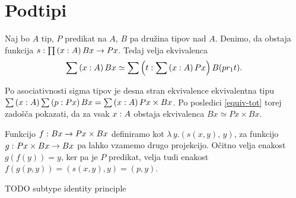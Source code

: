 \section{Podtipi}

\begin{trditev}
  \label{full-subtype}
  Naj bo \(A\) tip, \(P\) predikat na \(A\), \(B\) pa družina tipov nad \(A\). Denimo, da
  obstaja funkcija \(s : \prod \left( x : A \right) Bx \to Px\). Tedaj velja ekvivalenca
  \[\sum \left( x : A \right) Bx \simeq \sum \left( t : \sum \left( x : A \right) Px \right) B (pr_{1} t).\]
\end{trditev}

\begin{dokaz}
  Po asociativnosti sigma tipov je desna stran ekvivalence ekvivalentna tipu
  \(\sum \left( x : A \right) \sum \left( p : Px \right) Bx = \sum \left( x : A \right) Px \times Bx\).
  Po posledici \ref{equiv-tot} torej zadošča pokazati, da za vsak \(x : A\)
  obstaja ekvivalenca \(Bx \simeq Px \times Bx\).

  Funkcijo \(f \,\colon Bx \to Px \times Bx\) definiramo kot
  \(\lambda \, y. \left(s(x,y),\, y\right)\), za funkcijo \(g \,\colon Px \times Bx \to Bx\) pa
  lahko vzamemo drugo projekcijo. Očitno velja enakost \(g(f(y)) = y\), ker pa je \(P\)
  predikat, velja tudi enakost
  \(f(g\left(p, y\right)) = \left(s(x, y), y\right) = \left(p, y\right)\).

\end{dokaz}

\begin{trditev}
  \label{subtype-id}
  TODO subtype identity principle
\end{trditev}

